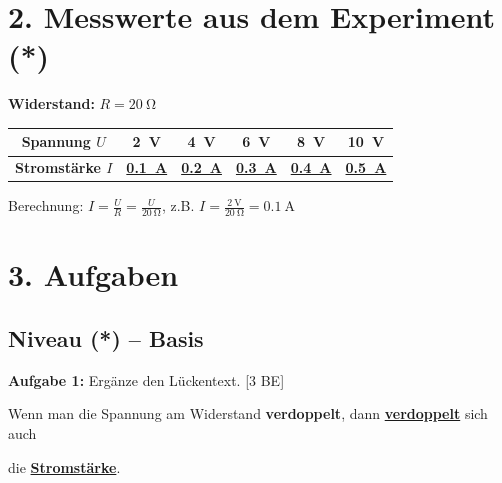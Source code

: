 \documentclass[11pt, a4paper]{article}
\newcommand{\lsg}[1]{\textcolor{loesung}{\textbf{\underline{#1}}}}
\newcommand{\niveauEins}{\textcolor{stern1}{\textbf{(*)}}}
\newcommand{\punkte}[1]{\hfill\textcolor{grau}{\small[#1 BE]}}
\begin{document}
\vspace{1em}


\section*{2. Messwerte aus dem Experiment \niveauEins}

\textbf{Widerstand:} $R = \SI{20}{\ohm}$

\vspace{0.5em}

\begin{center}
\begin{tabular}{|c|c|c|c|c|c|}
\hline
\textbf{Spannung $U$} & \SI{2}{\volt} & \SI{4}{\volt} & \SI{6}{\volt} & \SI{8}{\volt} & \SI{10}{\volt} \\
\hline
\textbf{Stromstärke $I$} & \lsg{\SI{0,1}{\ampere}} & \lsg{\SI{0,2}{\ampere}} & \lsg{\SI{0,3}{\ampere}} & \lsg{\SI{0,4}{\ampere}} & \lsg{\SI{0,5}{\ampere}} \\
\hline
\end{tabular}
\end{center}

\textcolor{loesung}{\small Berechnung: $I = \frac{U}{R} = \frac{U}{\SI{20}{\ohm}}$, z.B. $I = \frac{\SI{2}{\volt}}{\SI{20}{\ohm}} = \SI{0,1}{\ampere}$}

\vspace{1em}


\section*{3. Aufgaben}

\subsection*{Niveau \niveauEins{} -- Basis}

\textbf{Aufgabe 1:} Ergänze den Lückentext. \punkte{3}

Wenn man die Spannung am Widerstand \textbf{verdoppelt}, dann \lsg{verdoppelt} sich auch

die \lsg{Stromstärke}.
\end{document}
